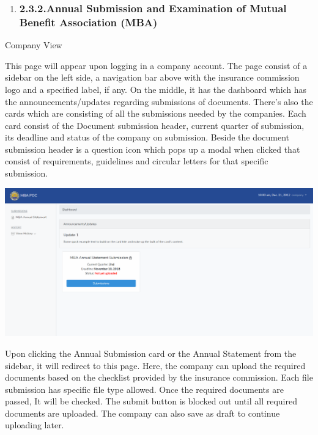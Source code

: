 \documentclass{article}
\begin{document}
\begin{enumerate}[noitemsep,topsep=\mdcompacttopsep]%

\item{}
\subsubsection{2.3.2.\hspace*{0.5em}Annual Submission and Examination of Mutual Benefit Association (MBA)}\label{sec-annual-submission-and-examination-of-mutual-benefit-association-mba}%
\end{enumerate}%

\noindent{}Company View%

This page will appear upon logging in a company
account. The page consist of a sidebar on the left side, a navigation
bar above with the insurance commission logo and a specified label, if
any. On the middle, it has the dashboard which has the
announcements/updates regarding submissions of documents. There's also
the cards which are consisting of all the submissions needed by the
companies. Each card consist of the Document submission header, current
quarter of submission, its deadline and status of the company on
submission. Beside the document submission header is a question icon
which pops up a modal when clicked that consist of requirements,
guidelines and circular letters for that specific submission.%

\mdhr{}%

\noindent{}\includegraphics[keepaspectratio=true]{up-ic-screens/image22}{}%

Upon clicking the Annual Submission card or the Annual
Statement from the sidebar, it will redirect to this page. Here, the
company can upload the required documents based on the checklist
provided by the insurance commission. Each file submission has specific
file type allowed. Once the required documents are passed, It will be
checked. The submit button is blocked out until all required documents
are uploaded. The company can also save as draft to continue uploading
later.%
\end{document}
